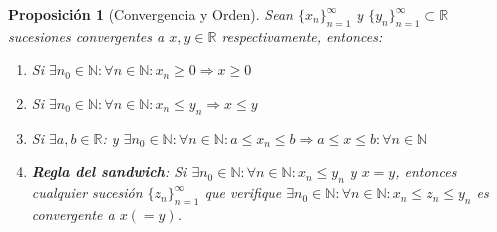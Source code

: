 \documentclass[10pt,a4paper,openright]{book}
\theoremstyle{break}
\newtheorem*{prop}{Proposición}
\begin{document}
\begin{prop}[Convergencia y Orden]
Sean $\{x_n\}_{n=1}^\infty$ y $\{y_n\}_{n=1}^\infty\subset \mathbb R$ sucesiones convergentes a $x,y\in \mathbb R$ respectivamente, entonces:
\begin{enumerate}
\item Si $\exists n_0 \in \mathbb{N}: \forall n\in \mathbb{N}: x_n\geq 0 \Rightarrow x\geq 0$
\item Si $\exists n_0 \in \mathbb{N}: \forall n\in \mathbb{N}: x_n\leq y_n \Rightarrow x\leq y$
\item Si $\exists a,b\in \mathbb R$: y $\exists n_0 \in \mathbb{N}: \forall n\in \mathbb{N}: a\leq x_n\leq b\Rightarrow a\leq x\leq b: \forall n \in \mathbb N$
\item \textbf{Regla del sandwich}: Si $\exists n_0 \in \mathbb{N}: \forall n\in \mathbb{N} : x_n\leq y_n$ y $x=y$, entonces cualquier sucesión $\{z_n\}_{n=1}^\infty $ que verifique $\exists n_0 \in \mathbb{N}: \forall n\in \mathbb{N} : x_n\leq z_n\leq y_n$ es convergente a $x(=y)$.
\end{enumerate}
\end{prop}
\end{document}
